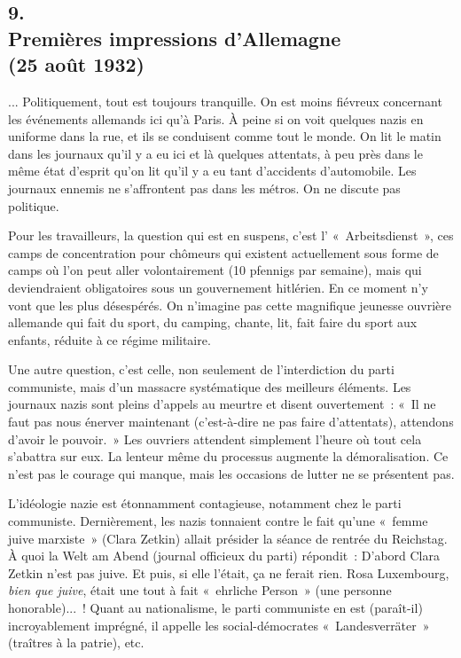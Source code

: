 \documentclass[french,twoside]{book} %
\begin{document}
\subsection[9. Premières impressions d'Allemagne  (25 août 1932)]{9. \\
Premières impressions d'Allemagne \protect\footnotemark  \\
(25 août 1932)}
\noindent \par
... Politiquement, tout est toujours tranquille. On est moins fiévreux concernant les événements allemands ici qu'à Paris. À peine si on voit quelques nazis en uniforme dans la rue, et ils se conduisent comme tout le monde. On lit le matin dans les journaux qu'il y a eu ici et là quelques attentats, à peu près dans le même état d'esprit qu'on lit qu'il y a eu tant d'accidents d'automobile. Les journaux ennemis ne s'affrontent pas dans les métros. On ne discute pas politique.\par
Pour les travailleurs, la question qui est en suspens, c'est l' « Arbeitsdienst », ces camps de concentration pour chômeurs qui existent actuellement sous forme de camps où l'on peut aller volontairement (10 pfennigs par semaine), mais qui deviendraient obligatoires sous un gouverne­ment hitlérien. En ce moment n'y vont que les plus désespérés. On n'imagine pas cette magnifique jeunesse ouvrière allemande qui fait du sport, du cam­ping, chante, lit, fait faire du sport aux enfants, réduite à ce régime militaire.\par
Une autre question, c'est celle, non seulement de l'interdiction du parti communiste, mais d'un massacre systématique des meilleurs éléments. Les journaux nazis sont pleins d'appels au meurtre et disent ouvertement : « Il ne faut pas nous énerver maintenant (c'est-à-dire ne pas faire d'attentats), attendons d'avoir le pouvoir. » Les ouvriers attendent simplement l'heure où tout cela s'abattra sur eux. La lenteur même du processus augmente la démora­lisation. Ce n'est pas le courage qui manque, mais les occasions de lutter ne se présentent pas.\par
L'idéologie nazie est étonnamment contagieuse, notamment chez le parti communiste. Dernièrement, les nazis tonnaient contre le fait qu'une « femme juive marxiste » (Clara Zetkin) allait présider la séance de rentrée du Reichstag. À quoi la Welt am Abend (journal officieux du parti) répondit : D'abord Clara Zetkin n'est pas juive. Et puis, si elle l'était, ça ne ferait rien. Rosa Luxembourg, {\itshape bien que juive}, était une tout à fait « ehrliche Person » (une personne honorable)... ! Quant au nationalisme, le parti communiste en est (paraît-il) incroyablement imprégné, il appelle les social-démocrates « Landesverräter » (traîtres à la patrie), etc.\par
\end{document}
